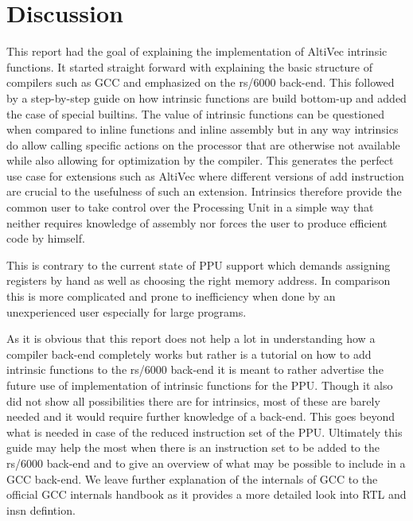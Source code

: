 \chapter{Discussion}
\label{chapter:discussion}

This report had the goal of explaining the implementation of AltiVec intrinsic functions. It started straight forward with explaining the basic structure of compilers such as GCC and emphasized on the rs/6000 back-end. This followed by a step-by-step guide on how intrinsic functions are build bottom-up and added the case of special builtins.
The value of intrinsic functions can be questioned when compared to inline functions and inline assembly but in any way intrinsics do allow calling specific actions on the processor that are otherwise not available while also allowing for optimization by the compiler. This generates the perfect use case for extensions such as AltiVec where different versions of add instruction are crucial to the usefulness of such an extension. Intrinsics therefore provide the common user to take control over the Processing Unit in a simple way that neither requires knowledge of assembly nor forces the user to produce efficient code by himself.

This is contrary to the current state of PPU support which demands assigning registers by hand as well as choosing the right memory address. In comparison this is more complicated and prone to inefficiency when done by an unexperienced user especially for large programs.

As it is obvious that this report does not help a lot in understanding how a compiler back-end completely works but rather is a tutorial on how to add intrinsic functions to the rs/6000 back-end it is meant to rather advertise the future use of implementation of intrinsic functions for the PPU. Though it also did not show all possibilities there are for intrinsics, most of these are barely needed and it would require further knowledge of a back-end. This goes beyond what is needed in case of the reduced instruction set of the PPU.
Ultimately this guide may help the most when there is an instruction set to be added to the rs/6000 back-end and to give an overview of what may be possible to include in a GCC back-end.
We leave further explanation of the internals of GCC to the official GCC internals handbook  as it provides a more detailed look into RTL and insn defintion.
